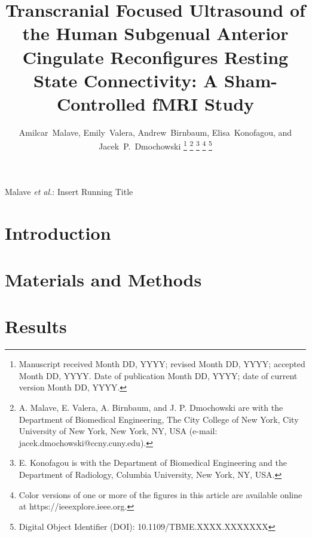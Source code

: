 \documentclass[journal]{IEEEtran}
\begin{document}
\title{Transcranial Focused Ultrasound of the Human Subgenual Anterior Cingulate Reconfigures Resting State Connectivity: A Sham-Controlled fMRI Study}

\author{Amilcar~Malave, Emily~Valera, Andrew~Birnbaum, Elisa~Konofagou, and Jacek~P.~Dmochowski%
\thanks{Manuscript received Month DD, YYYY; revised Month DD, YYYY; accepted Month DD, YYYY. Date of publication Month DD, YYYY; date of current version Month DD, YYYY.}%
\thanks{A. Malave, E. Valera, A. Birnbaum, and J. P. Dmochowski are with the Department of Biomedical Engineering, The City College of New York, City University of New York, New York, NY, USA (e-mail: jacek.dmochowski@ccny.cuny.edu).}%
\thanks{E. Konofagou is with the Department of Biomedical Engineering and the Department of Radiology, Columbia University, New York, NY, USA.}%
\thanks{Color versions of one or more of the figures in this article are available online at https://ieeexplore.ieee.org.}%
\thanks{Digital Object Identifier (DOI): 10.1109/TBME.XXXX.XXXXXXX}}

%
{Malave \MakeLowercase{\textit{et al.}}: Insert Running Title}

\maketitle

\begin{abstract}

\end{abstract}

\begin{IEEEkeywords}

\end{IEEEkeywords}

\section{Introduction}
\label{sec:introduction}


\section{Materials and Methods}
\label{sec:methods}


\section{Results}
\label{sec:results}


\end{document}
